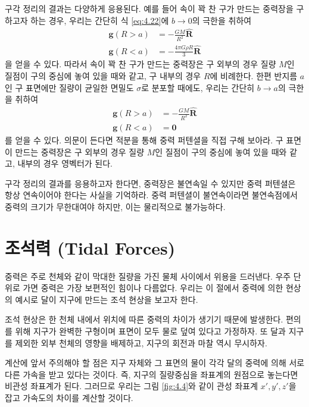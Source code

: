 \documentclass[chapter, oneside, b5paper]{oblivoir}
\theoremstyle{plain}
\theoremstyle{definition}
\theoremstyle{remark}
\begin{document}
구각 정리의 결과는 다양하게 응용된다. 예를 들어 속이 꽉 찬 구가 만드는 중력장을 구하고자 하는 경우, 우리는 간단히 식 \ref{eq:4.22}에 $b \to 0$의 극한을 취하여
\begin{equation}
    \begin{aligned}
        \mathbf{g}(R>a) &= -\frac{GM}{R^2} \mathbf{\hat{R}} \\
        \mathbf{g}(R<a) &= -\frac{4 \pi G \rho R}{3} \mathbf{\hat{R}}
    \end{aligned}
\end{equation}
을 얻을 수 있다. 따라서 속이 꽉 찬 구가 만드는 중력장은 구 외부의 경우 질량 $M$인 질점이 구의 중심에 놓여 있을 때와 같고, 구 내부의 경우 $R$에 비례한다. 한편 반지름 $a$인 구 표면에만 질량이 균일한 면밀도 $\sigma$로 분포할 때에도, 우리는 간단히 $b \to a$의 극한을 취하여
\begin{equation}
    \begin{aligned}
        \mathbf{g}(R>a) &= -\frac{GM}{R^2} \mathbf{\hat{R}} \\
        \mathbf{g}(R<a) &= \mathbf{0}
    \end{aligned}
\end{equation}
를 얻을 수 있다. 의문이 든다면 적분을 통해 중력 퍼텐셜을 직접 구해 보아라. 구 표면이 만드는 중력장은 구 외부의 경우 질량 $M$인 질점이 구의 중심에 놓여 있을 때와 같고, 내부의 경우 영벡터가 된다.

구각 정리의 결과를 응용하고자 한다면, 중력장은 불연속일 수 있지만 중력 퍼텐셜은 항상 연속이어야 한다는 사실을 기억하라. 중력 퍼텐셜이 불연속이라면 불연속점에서 중력의 크기가 무한대여야 하지만, 이는 물리적으로 불가능하다.

\section{조석력 (Tidal Forces)}
중력은 주로 천체와 같이 막대한 질량을 가진 물체 사이에서 위용을 드러낸다. 우주 단위로 가면 중력은 가장 보편적인 힘이나 다름없다. 우리는 이 절에서 중력에 의한 현상의 예시로 달이 지구에 만드는 조석 현상을 보고자 한다.

조석 현상은 한 천체 내에서 위치에 따른 중력의 차이가 생기기 때문에 발생한다. 편의를 위해 지구가 완벽한 구형이며 표면이 모두 물로 덮여 있다고 가정하자. 또 달과 지구를 제외한 외부 천체의 영향을 배제하고, 지구의 회전과 마찰 역시 무시하자.

계산에 앞서 주의해야 할 점은 지구 자체와 그 표면의 물이 각각 달의 중력에 의해 서로 다른 가속을 받고 있다는 것이다. 즉, 지구의 질량중심을 좌표계의 원점으로 놓는다면 비관성 좌표계가 된다. 그러므로 우리는 그림 \ref{fig:4.4}와 같이 관성 좌표계 $x', y', z'$을 잡고 가속도의 차이를 계산할 것이다.
\end{document}

